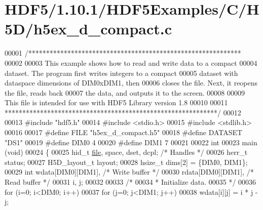 \hypertarget{_h_d_f5_21_810_81_2_h_d_f5_examples_2_c_2_h5_d_2h5ex__d__compact_8c_source}{}\section{H\+D\+F5/1.10.1/\+H\+D\+F5\+Examples/\+C/\+H5\+D/h5ex\+\_\+d\+\_\+compact.c}
\label{_h_d_f5_21_810_81_2_h_d_f5_examples_2_c_2_h5_d_2h5ex__d__compact_8c_source}

\begin{DoxyCode}
00001 \textcolor{comment}{/************************************************************}
00002 \textcolor{comment}{}
00003 \textcolor{comment}{  This example shows how to read and write data to a compact}
00004 \textcolor{comment}{  dataset.  The program first writes integers to a compact}
00005 \textcolor{comment}{  dataset with dataspace dimensions of DIM0xDIM1, then}
00006 \textcolor{comment}{  closes the file.  Next, it reopens the file, reads back}
00007 \textcolor{comment}{  the data, and outputs it to the screen.}
00008 \textcolor{comment}{}
00009 \textcolor{comment}{  This file is intended for use with HDF5 Library version 1.8}
00010 \textcolor{comment}{}
00011 \textcolor{comment}{ ************************************************************/}
00012 
00013 \textcolor{preprocessor}{#include "hdf5.h"}
00014 \textcolor{preprocessor}{#include <stdio.h>}
00015 \textcolor{preprocessor}{#include <stdlib.h>}
00016 
00017 \textcolor{preprocessor}{#define FILE            "h5ex\_d\_compact.h5"}
00018 \textcolor{preprocessor}{#define DATASET         "DS1"}
00019 \textcolor{preprocessor}{#define DIM0            4}
00020 \textcolor{preprocessor}{#define DIM1            7}
00021 
00022 \textcolor{keywordtype}{int}
00023 main (\textcolor{keywordtype}{void})
00024 \{
00025     hid\_t       \hyperlink{structfile}{file}, space, dset, dcpl;    \textcolor{comment}{/* Handles */}
00026     herr\_t      status;
00027     H5D\_layout\_t    layout;
00028     hsize\_t     dims[2] = \{DIM0, DIM1\};
00029     \textcolor{keywordtype}{int}         wdata[DIM0][DIM1],          \textcolor{comment}{/* Write buffer */}
00030                 rdata[DIM0][DIM1],          \textcolor{comment}{/* Read buffer */}
00031                 i, j;
00032 
00033     \textcolor{comment}{/*}
00034 \textcolor{comment}{     * Initialize data.}
00035 \textcolor{comment}{     */}
00036     \textcolor{keywordflow}{for} (i=0; i<DIM0; i++)
00037         \textcolor{keywordflow}{for} (j=0; j<DIM1; j++)
00038             wdata[i][j] = i * j - j;

\end{DoxyCode}
